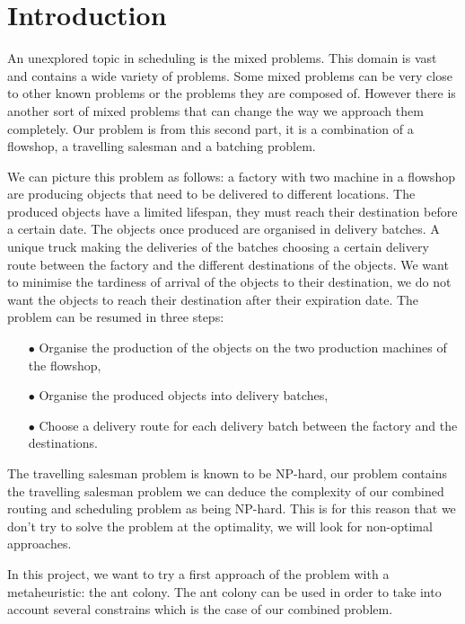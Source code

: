 \documentclass[UTF8, twoside]{EPURapport}
\begin{document}
\chapter{Introduction}

	\hspace{4ex}An unexplored topic in scheduling is the mixed problems. This domain is vast and contains a wide variety of problems. Some mixed problems can be very close to other known problems or the problems they are composed of. However there is another sort of mixed problems that can change the way we approach them completely. Our problem is from this second part, it is a combination of a flowshop, a travelling salesman and a batching problem.
	
	We can picture this problem as follows: a factory with two machine in a flowshop are producing objects that need to be delivered to different locations. The produced objects have a limited lifespan, they must reach their destination before a certain date. The objects once produced are organised in delivery batches. A unique truck making the deliveries of the batches choosing a certain delivery route between the factory and the different destinations of the objects. We want to minimise the tardiness of arrival of the objects to their destination, we do not want the objects to reach their destination after their expiration date. The problem can be resumed in three steps:
\begin{itemize}
\item[$\bullet$] Organise the production of the objects on the two production machines of the flowshop,
\item[$\bullet$] Organise the produced objects into delivery batches,
\item[$\bullet$] Choose a delivery route for each delivery batch between the factory and the destinations.
\end{itemize}

	The travelling salesman problem is known to be NP-hard, our problem contains the travelling salesman problem we can deduce the complexity of our combined routing and scheduling problem as being NP-hard. This is for this reason that we don't try to solve the problem at the optimality, we will look for non-optimal approaches.

	In this project, we want to try a first approach of the problem with a metaheuristic: the ant colony. The ant colony can be used in order to take into account several constrains which is the case of our combined problem.
	\\
	
\end{document}
